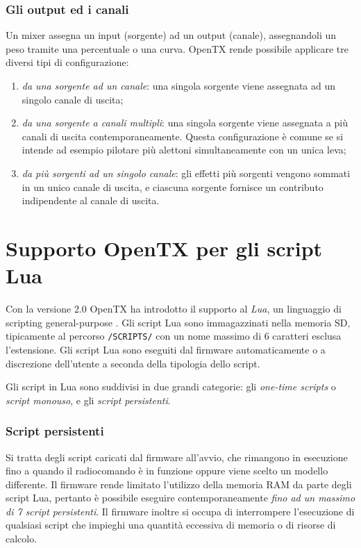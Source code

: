 \documentclass[a4paper, 12pt]{report}
\begin{document}
\subsubsection{Gli output ed i canali}
Un mixer assegna un input (sorgente) ad un output (canale), assegnandoli un peso tramite una percentuale o una curva. OpenTX rende possibile applicare tre diversi tipi di configurazione:
\begin{enumerate}
        \item \emph{da una sorgente ad un canale}: una singola sorgente viene assegnata ad un singolo canale di uscita;
        \item \emph{da una sorgente a canali multipli}: una singola sorgente viene assegnata a più canali di uscita contemporaneamente. Questa configurazione è comune se si intende ad esempio pilotare più alettoni simultaneamente con un unica leva;
        \item \emph{da più sorgenti ad un singolo canale}: gli effetti più sorgenti vengono sommati in un unico canale di uscita, e ciascuna sorgente fornisce un contributo indipendente al canale di uscita.
\end{enumerate}




\section{Supporto OpenTX per gli script Lua}

Con la versione 2.0 OpenTX \cite{opentx-lua-instructions} ha introdotto il supporto al \emph{Lua}, un linguaggio di scripting general-purpose \cite{lua-website}. Gli script Lua sono immagazzinati nella memoria SD, tipicamente al percorso \texttt{/SCRIPTS/} con un nome massimo di 6 caratteri esclusa l'estensione. Gli script Lua sono eseguiti dal firmware automaticamente o a discrezione dell'utente a seconda della tipologia dello script.

Gli script in Lua sono suddivisi in due grandi categorie: gli \emph{one-time scripts} o \emph{script monouso}, e gli \emph{script persistenti}.

\subsubsection{Script persistenti}
Si tratta degli script caricati dal firmware all'avvio, che rimangono in esecuzione fino a quando il radiocomando è in funzione oppure viene scelto un modello differente. Il firmware rende limitato l'utilizzo della memoria RAM da parte degli script Lua, pertanto è possibile eseguire contemporaneamente \emph{fino ad un massimo di 7 script persistenti}. Il firmware inoltre si occupa di interrompere l'esecuzione di qualsiasi script che impieghi una quantità eccessiva di memoria o di risorse di calcolo.
\end{document}
